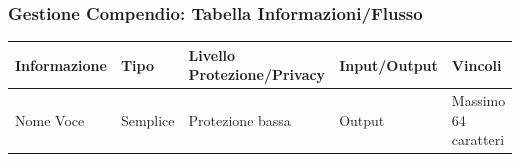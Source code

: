 \documentclass[a4paper, 11pt]{article}
\let\newline\\
\begin{document}
\subsubsection*{Gestione Compendio: Tabella Informazioni/Flusso}
\begin{adjustwidth}{-1.5cm}{-1.5cm}
\begin{center}
    \begin{tabular}{|p{3cm}|p{1.5cm}|p{3.5cm}|p{2.5cm}|p{4cm}|}
        \hline
        \textbf{Informazione} & \textbf{Tipo} & \textbf{Livello \newline Protezione/Privacy} & \textbf{Input/Output}&\textbf{Vincoli}\\
        \hline
        Nome Voce & Semplice & Protezione bassa & Output & Massimo 64 caratteri\\\hline
        
    \end{tabular}
\end{center}
\end{adjustwidth}

\vspace{2em}
\end{document}

